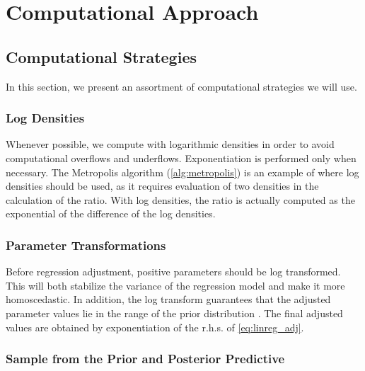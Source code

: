 \chapter{Computational Approach}\label{chap:comp_approach}


\section{Computational Strategies}

In this section, we present an assortment of computational strategies we will use. 


\subsection{Log Densities}

Whenever possible, we compute with logarithmic densities in order to avoid computational overflows and underflows. Exponentiation is performed only when necessary. The Metropolis algorithm (\cref{alg:metropolis}) is an example of where log densities should be used, as it requires evaluation of two densities in the calculation of the ratio. With log densities, the ratio is actually computed as the exponential of the difference of the log densities.   

\subsection{Parameter Transformations}
Before regression adjustment, positive parameters should be log transformed. This will both stabilize the variance of the regression model and make it more homoscedastic. In addition, the log transform guarantees that the adjusted parameter values lie in the range of the prior distribution \cite{ABC_ch3}. The final adjusted values are obtained by exponentiation of the r.h.s. of \autoref{eq:linreg_adj}.


\subsection{Sample from the Prior and Posterior Predictive} 

